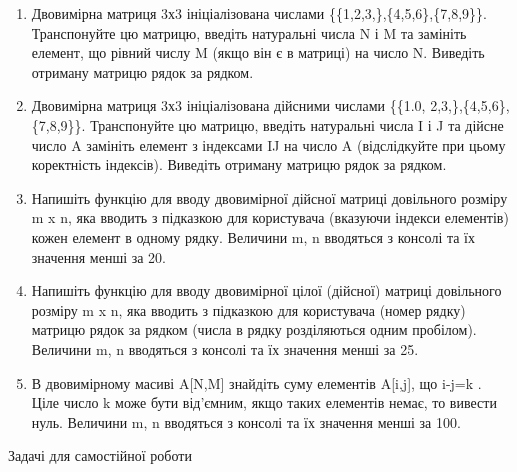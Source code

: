 \documentclass[]{article}
\begin{document}
\begin{enumerate}
\def\labelenumi{\arabic{enumi})}
\item
  Двовимірна матриця 3х3 ініціалізована числами
  \{\{1,2,3,\},\{4,5,6\},\{7,8,9\}\}. Транспонуйте цю матрицю, введіть
  натуральні числа N і M та замініть елемент, що рівний числу M (якщо
  він є в матриці) на число N. Виведіть отриману матрицю рядок за
  рядком.
\item
  Двовимірна матриця 3х3 ініціалізована дійсними числами \{\{1.0,
  2,3,\},\{4,5,6\},\{7,8,9\}\}. Транспонуйте цю матрицю, введіть
  натуральні числа I і J та дійсне число A замініть елемент з індексами
  IJ на число A (відслідкуйте при цьому коректність індексів). Виведіть
  отриману матрицю рядок за рядком.
\item
  Напишіть функцію для вводу двовимірної дійсної матриці довільного
  розміру m x n, яка вводить з підказкою для користувача (вказуючи
  індекси елементів) кожен елемент в одному рядку. Величини m, n
  вводяться з консолі та їх значення менші за 20.
\item
  Напишіть функцію для вводу двовимірної цілої (дійсної) матриці
  довільного розміру m x n, яка вводить з підказкою для користувача
  (номер рядку) матрицю рядок за рядком (числа в рядку розділяються
  одним пробілом). Величини m, n вводяться з консолі та їх значення
  менші за 25.
\item
  В двовимірному масиві A{[}N,M{]} знайдіть суму елементів A{[}i,j{]},
  що i-j=k . Ціле число k може бути від'ємним, якщо таких елементів
  немає, то вивести нуль. Величини m, n вводяться з консолі та їх
  значення менші за 100.
\end{enumerate}

Задачі для самостійної роботи
\end{document}
